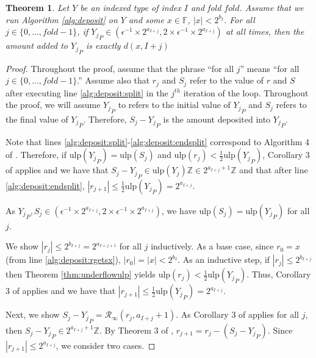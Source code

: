 \documentclass[12pt]{article}
\providecommand{\F}{\ensuremath{\mathbb{F}}}
\providecommand{\Z}{\ensuremath{\mathbb{Z}}}
\providecommand{\ulp}{\ensuremath{\text{ulp}}}
\providecommand{\roundtonearestinfty}{\ensuremath{\mathcal{R}_\text{$\infty$}}}
\theoremstyle{plain}
\newtheorem{thm}{Theorem}[section]
\numberwithin{equation}{section}
\begin{document}
      \begin{thm}
        Let $Y$ be an indexed type of index $I$ and fold $fold$. Assume that we run Algorithm \ref{alg:deposit} on $Y$ and some $x \in \F$, $|x| < 2^{b_I}$. For all $j \in \{0, ..., fold - 1\}$, if ${Y_j}_P \in (\epsilon^{-1} \times 2^{a_{I + j}}, 2 \times \epsilon^{-1} \times 2^{a_{I + j}})$ at all times, then the amount added to ${Y_j}_P$ is exactly $d(x, I + j)$
        \label{thm:ddeposit}
      \end{thm}
      \begin{proof}
        Throughout the proof, assume that the phrase ``for all $j$'' means ``for all $j \in \{0, ..., fold - 1\}$.'' Assume also that $r_j$ and $S_j$ refer to the value of $r$ and $S$ after executing line \ref{alg:deposit:split} in the $j^{th}$ iteration of the loop. Throughout the proof, we will assume ${Y_j}_P$ to refers to the initial value of ${Y_j}_P$ and $S_j$ refers to the final value of ${Y_j}_P$. Therefore, $S_j - {Y_j}_P$ is the amount deposited into ${Y_j}_P$.

        Note that lines \ref{alg:deposit:split}-\ref{alg:deposit:endsplit} correspond to Algorithm 4 of \cite{repsum}.
        Therefore, if $\ulp({Y_j}_P) = \ulp(S_j)$ and $\ulp(r_j) < \frac{1}{2}\ulp({Y_j}_P)$, Corollary 3 of \cite{repsum} applies and we have that $S_j - {Y_j}_P \in \ulp({Y_j})\Z \in 2^{a_{I + j} + 1}\Z$ and that after line \ref{alg:deposit:endsplit}, $|r_{j + 1}| \leq \frac{1}{2}\ulp({Y_j}_P) = 2^{a_{I + j}}$.

        As ${Y_j}_P, S_j \in (\epsilon^{-1} \times 2^{a_{I + j}}, 2 \times \epsilon^{-1} \times 2^{a_{I + j}})$, we have $\ulp(S_j) = \ulp({Y_j}_P)$ for all $j$.

        We show $|r_j| \leq 2^{b_{I + j}} = 2^{a_{I + j + 1}}$ for all $j$ inductively. As a base case, since $r_0 = x$ (from line \ref{alg:deposit:rgetsx}), $|r_0| = |x| < 2^{b_{I}}$.
        As an inductive step, if $|r_j| \leq 2^{b_{I + j}}$ then Theorem \ref{thm:underflowulp} yields $\ulp(r_j) < \frac{1}{2}\ulp({Y_j}_P)$. Thus, Corollary 3 of \cite{repsum} applies and we have that $|r_{j + 1}| \leq \frac{1}{2}\ulp({Y_j}_P) = 2^{a_{I + j}}$.

        Next, we show $S_j - {Y_j}_P = \roundtonearestinfty(r_j, a_{I + j} + 1)$. As Corollary 3 of \cite{repsum} applies for all $j$, then $S_j - {Y_j}_P \in 2^{a_{I + j} + 1}\Z$. By Theorem 3 of \cite{repsum}, $r_{j + 1} = r_j - (S_j - {Y_j}_P)$. Since $|r_{j + 1}| \leq 2^{a_{I + j}}$, we consider two cases.


\end{proof}
\end{document}
